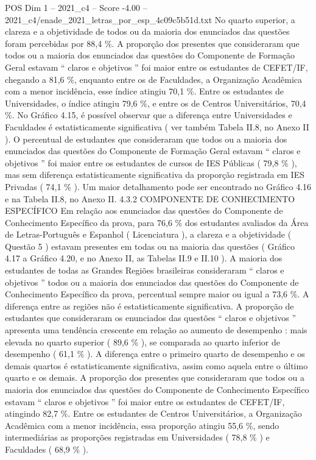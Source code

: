 \begin{textsample}{POS Dim 1 – 2021\_c4 – Score -4.00 – 2021\_c4/enade\_2021\_letras\_por\_esp\_4c09c5b51d.txt}
No quarto superior, a clareza e a objetividade de todos ou da maioria dos enunciados das questões foram percebidas por 88,4 \%.
A proporção dos presentes que consideraram que todos ou a maioria dos enunciados das questões do Componente de Formação Geral estavam “ claros e objetivos ” foi maior entre os estudantes de CEFET/IF, chegando a 81,6 \%, enquanto entre os de Faculdades, a Organização Acadêmica com a menor incidência, esse índice atingiu 70,1 \%.
Entre os estudantes de Universidades, o índice atingiu 79,6 \%, e entre os de Centros Universitários, 70,4 \%.
No Gráfico 4.15, é possível observar que a diferença entre Universidades e Faculdades é estatisticamente significativa ( ver também Tabela II.8, no Anexo II ).
O percentual de estudantes que consideraram que todos ou a maioria dos enunciados das questões do Componente de Formação Geral estavam “ claros e objetivos ” foi maior entre os estudantes de cursos de IES Públicas ( 79,8 \% ), mas sem diferença estatisticamente significativa da proporção registrada em IES Privadas ( 74,1 \% ).
Um maior detalhamento pode ser encontrado no Gráfico 4.16 e na Tabela II.8, no Anexo II. 4.3.2 COMPONENTE DE CONHECIMENTO ESPECÍFICO Em relação aos enunciados das questões do Componente de Conhecimento Específico da prova, para 76,6 \% dos estudantes avaliados da Área de Letras-Português e Espanhol ( Licenciatura ), a clareza e a objetividade ( Questão 5 ) estavam presentes em todas ou na maioria das questões ( Gráfico 4.17 a Gráfico 4.20, e no Anexo II, as Tabelas II.9 e II.10 ).
A maioria dos estudantes de todas as Grandes Regiões brasileiras consideraram “ claros e objetivos ” todos ou a maioria dos enunciados das questões do Componente de Conhecimento Específico da prova, percentual sempre maior ou igual a 73,6 \%.
A diferença entre as regiões não é estatisticamente significativa.
A proporção de estudantes que consideraram os enunciados das questões “ claros e objetivos ” apresenta uma tendência crescente em relação ao aumento de desempenho : mais elevada no quarto superior ( 89,6 \% ), se comparada ao quarto inferior de desempenho ( 61,1 \% ).
A diferença entre o primeiro quarto de desempenho e os demais quartos é estatisticamente significativa, assim como aquela entre o último quarto e os demais.
A proporção dos presentes que consideraram que todos ou a maioria dos enunciados das questões do Componente de Conhecimento Específico estavam “ claros e objetivos ” foi maior entre os estudantes de CEFET/IF, atingindo 82,7 \%.
Entre os estudantes de Centros Universitários, a Organização Acadêmica com a menor incidência, essa proporção atingiu 55,6 \%, sendo intermediárias as proporções registradas em Universidades ( 78,8 \% ) e Faculdades ( 68,9 \% ).

\end{textsample}
